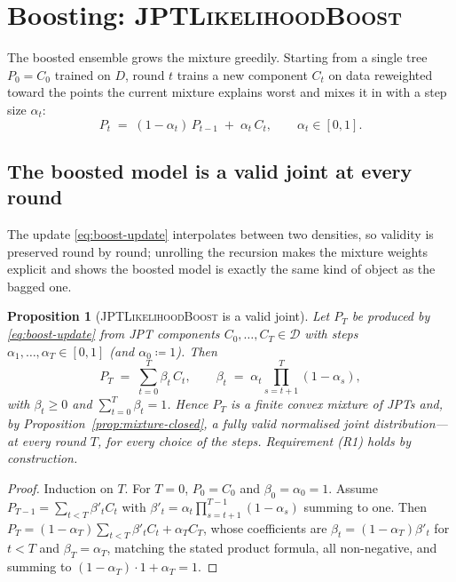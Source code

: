 \documentclass[11pt]{article}
\theoremstyle{plain}
\newtheorem{proposition}[theorem]{Proposition}
\theoremstyle{definition}
\theoremstyle{remark}
\newcommand{\Dens}{\mathcal{D}}
\newcommand{\likeboost}{\textsc{JPTLikelihoodBoost}}
\begin{document}
\section{Boosting: \likeboost}
\label{sec:likeboost}

The boosted ensemble grows the mixture greedily. Starting from a single
tree $P_0=C_0$ trained on $D$, round $t$ trains a new component $C_t$ on
data reweighted toward the points the current mixture explains worst and
mixes it in with a step size $\alpha_t$:
\begin{equation}
\label{eq:boost-update}
P_t \;=\; (1-\alpha_t)\,P_{t-1} \;+\; \alpha_t\, C_t,
\qquad \alpha_t\in[0,1] .
\end{equation}

\subsection{The boosted model is a valid joint at every round}

The update \eqref{eq:boost-update} interpolates between two densities, so
validity is preserved round by round; unrolling the recursion makes the
mixture weights explicit and shows the boosted model is exactly the same
kind of object as the bagged one.

\begin{proposition}[\likeboost{} is a valid joint]
\label{prop:boost-valid}
Let $P_T$ be produced by \eqref{eq:boost-update} from JPT components
$C_0,\dots,C_T\in\Dens$ with steps $\alpha_1,\dots,\alpha_T\in[0,1]$
(and $\alpha_0\coloneqq1$). Then
\[
P_T \;=\; \sum_{t=0}^{T} \beta_t\, C_t,
\qquad
\beta_t \;=\; \alpha_t \prod_{s=t+1}^{T} (1-\alpha_s),
\]
with $\beta_t\ge 0$ and $\sum_{t=0}^T\beta_t=1$. Hence $P_T$ is a finite
convex mixture of JPTs and, by Proposition~\ref{prop:mixture-closed}, a
fully valid normalised joint distribution---at every round $T$, for every
choice of the steps. Requirement (R1) holds by construction.
\end{proposition}
\begin{proof}
Induction on $T$. For $T=0$, $P_0=C_0$ and $\beta_0=\alpha_0=1$. Assume
$P_{T-1}=\sum_{t<T}\beta'_t C_t$ with $\beta'_t=\alpha_t\prod_{s=t+1}^{T-1}
(1-\alpha_s)$ summing to one. Then
$P_T=(1-\alpha_T)\sum_{t<T}\beta'_t C_t+\alpha_T C_T$, whose coefficients
are $\beta_t=(1-\alpha_T)\beta'_t$ for $t<T$ and $\beta_T=\alpha_T$,
matching the stated product formula, all non-negative, and summing to
$(1-\alpha_T)\cdot 1+\alpha_T=1$.
\end{proof}
\end{document}
